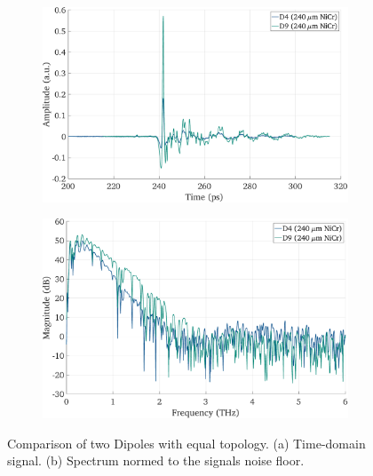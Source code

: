 \begin{figure}[!tbp]
    \centering
    \begin{subfigure}[b]{0.485\textwidth}
        \centering
        \includegraphics[width=\textwidth]{figures/Results/D4_D9/D4_D9_time.pdf}
        \caption{}
    \end{subfigure}
    \hfill
    \begin{subfigure}[b]{0.485\textwidth}
        \centering
        \includegraphics[width=\textwidth]{figures/Results/D4_D9/D4_D9_spectrum_nn.pdf}
        \caption{}
    \end{subfigure}
    \caption{Comparison of two Dipoles with equal topology. (a) Time-domain signal. (b) Spectrum normed to the signals noise floor.}
\end{figure}

